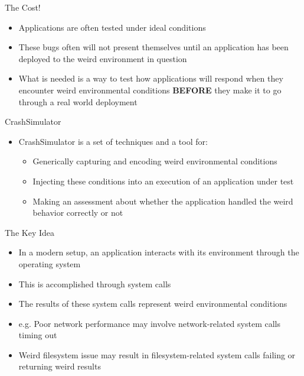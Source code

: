 \documentclass[pdf]{beamer}
\begin{document}
\begin{frame}{The Cost!}
  \begin{itemize}
  \item{Applications are often tested under ideal conditions}
  \item{These bugs often will not present themselves until an application has
      been deployed to the weird environment in question}
  \item{What is needed is a way to test how applications will respond when they
      encounter weird environmental conditions \textbf{BEFORE} they make it to
      go through a real world deployment}
  \end{itemize}
\end{frame}


\begin{frame}{CrashSimulator}
  \begin{itemize}
  \item{CrashSimulator is a set of techniques and a tool for:}
    \begin{itemize}
    \item{Generically capturing and encoding weird environmental conditions}
    \item{Injecting these conditions into an execution of an application under
        test}
    \item{Making an assessment about whether the application handled the
        weird behavior correctly or not}
    \end{itemize}
  \end{itemize}
\end{frame}


\begin{frame}{The Key Idea}
  \begin{itemize}
  \item{In a modern setup, an application interacts with its environment
      through the operating system}
  \item{This is accomplished through system calls}
  \item{The results of these system calls represent weird environmental conditions}
  \item{e.g. Poor network performance may involve network-related system
      calls timing out}
  \item{Weird filesystem issue may result in filesystem-related system
      calls failing or returning weird results}
  \end{itemize}
\end{frame}
\end{document}
